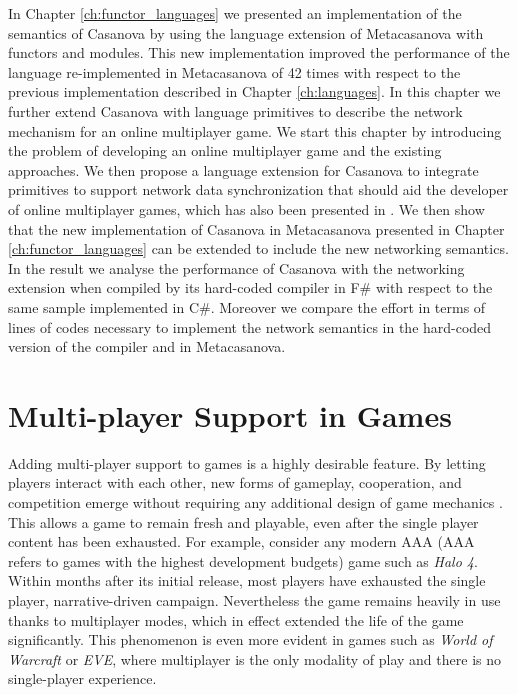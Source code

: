 In Chapter \ref{ch:functor_languages} we presented an implementation of the semantics of Casanova by using the language extension of Metacasanova with functors and modules. This new implementation improved the performance of the language re-implemented in Metacasanova of 42 times with respect to the previous implementation described in Chapter \ref{ch:languages}. In this chapter we further extend Casanova with language primitives to describe the network mechanism for an online multiplayer game. We start this chapter by introducing the problem of developing an online multiplayer game and the existing approaches. We then propose a language extension for Casanova to integrate primitives to support network data synchronization that should aid the developer of online multiplayer games, which has also been presented in \cite{DIGIACOMO201725}. We then show that the new implementation of Casanova in Metacasanova presented in Chapter \ref{ch:functor_languages} can be extended to include the new networking semantics. In the result we analyse the performance of Casanova with the networking extension when compiled by its hard-coded compiler in F\# with respect to the same sample implemented in C\#. Moreover we compare the effort in terms of lines of codes necessary to implement the network semantics in the hard-coded version of the compiler and in Metacasanova.

\section{Multi-player Support in Games}
Adding multi-player support to games is a highly desirable feature. By letting players interact with each other, new forms of gameplay, cooperation, and competition emerge without requiring any additional design of game mechanics \cite{granberg2014david}. This allows a game to remain fresh and playable, even after the single player content has been exhausted. For example, consider any modern AAA (AAA refers to games with the highest development budgets\cite{wolf2008video}) game such as \textit{Halo 4}. Within months after its initial release, most players have exhausted the single player, narrative-driven campaign. Nevertheless the game remains heavily in use thanks to multiplayer modes, which in effect extended the life of the game significantly. This phenomenon is even more evident in games such as \textit{World of Warcraft} or \textit{EVE}, where multiplayer is the only modality of play and there is no single-player experience.

